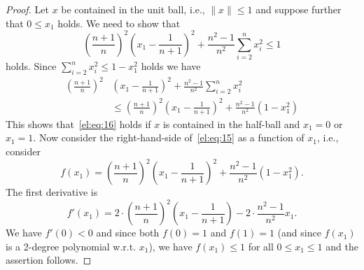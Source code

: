 \begin{proof} 
  Let $x$ be contained in the unit ball, i.e., $\|x\|\leq1$ and suppose
  further that $0\leq x_1$ holds.  We need to show that 
  \begin{equation}
    \label{el:eq:16}
    \left(\frac{n+1}{n}\right)^2  \left( x_1 -
      \frac{1}{n+1}\right)^2 + \frac{n^2-1}{n^2} \sum_{i=2}^n x_i^2 \leq1 
  \end{equation}
  holds. 
  Since $\sum_{i=2}^nx_i^2\leq1 - x_1^2$ holds we have 
  \begin{equation}
    \label{el:eq:15}
    \begin{split}      
    \left(\frac{n+1}{n}\right)^2 & \left( x_1 -
      \frac{1}{n+1}\right)^2  + \frac{n^2-1}{n^2} \sum_{i=2}^n x_i^2 \\    
                            & \leq     \left(\frac{n+1}{n}\right)^2  \left( x_1 -
      \frac{1}{n+1}\right)^2 + \frac{n^2-1}{n^2} \left(1-x_1^2\right)     
  \end{split}
\end{equation}
This shows that~\eqref{el:eq:16} holds if $x$ is contained in the
half-ball and $x_1=0$ or $x_1=1$. Now consider the right-hand-side
of~\eqref{el:eq:15} as a function of $x_1$, i.e., consider 
\begin{equation}
  \label{el:eq:17}
  f(x_1) = \left(\frac{n+1}{n}\right)^2  \left( x_1 -
    \frac{1}{n+1}\right)^2 + \frac{n^2-1}{n^2} (1-x_1^2).    
\end{equation}
The first derivative is 
\begin{equation}
\label{el:eq:18}
  f'(x_1) = 2\cdot \left(\frac{n+1}{n}\right)^2  \left( x_1 -
    \frac{1}{n+1}\right) -  2\cdot \frac{n^2-1}{n^2} x_1.    
\end{equation}
We have $f'(0)<0$ and since both $f(0)=1$ and $f(1)=1$ (and since 
$f(x_1)$ is a 2-degree polynomial w.r.t. $x_1$),  we have
$f(x_1)\leq1$ for all $0\leq x_1\leq1$ and the assertion follows. 
\end{proof}



